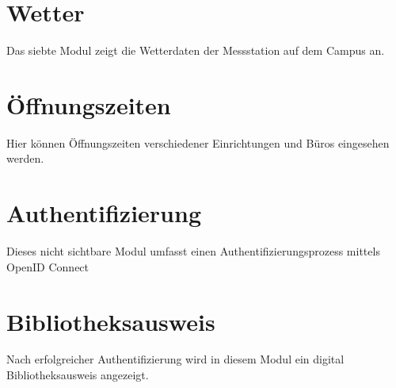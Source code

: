 \section{Wetter}
\label{sec:contents:weather}
Das siebte Modul zeigt die Wetterdaten der Messstation auf dem Campus an.

\section{Öffnungszeiten}
\label{sec:contents:officeHours}
Hier können Öffnungszeiten verschiedener Einrichtungen und Büros eingesehen werden.

\section{Authentifizierung}
\label{sec:contents:auth}
Dieses nicht sichtbare Modul umfasst einen Authentifizierungsprozess mittels OpenID Connect

\section{Bibliotheksausweis}
\label{sec:contents:bibID}
Nach erfolgreicher Authentifizierung wird in diesem Modul ein digital Bibliotheksausweis angezeigt.